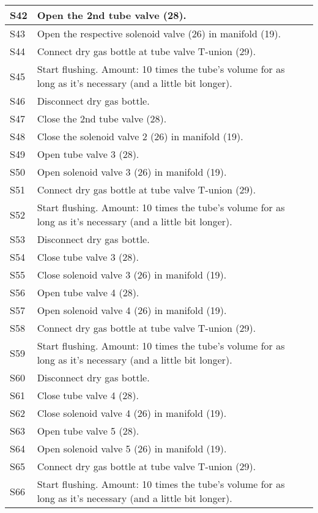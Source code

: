 \begin{longtable} {|m{}|m{}|m{}|}
\hline
S42 & Open the 2nd tube valve (28). & \\
\hline
S43 & Open the respective solenoid valve (26) in manifold (19). & \\
\hline
S44 & Connect dry gas bottle at tube valve T-union (29). & \\
\hline
S45 & Start flushing. Amount: 10 times the tube's volume for as long as it's necessary (and a little bit longer). & \\
\hline
S46 & Disconnect dry gas bottle. & \\
\hline
S47 & Close the 2nd tube valve (28). & \\
\hline
S48 & Close the solenoid valve 2 (26) in manifold (19). & \\
\hline
S49 & Open tube valve 3 (28). & \\
\hline
S50 & Open solenoid valve 3 (26) in manifold (19). & \\
\hline
S51 & Connect dry gas bottle at tube valve T-union (29). & \\
\hline
S52 & Start flushing. Amount: 10 times the tube's volume for as long as it's necessary (and a little bit longer). & \\
\hline
S53 & Disconnect dry gas bottle. & \\
\hline
S54 & Close tube valve 3 (28). & \\
\hline
S55 & Close solenoid valve 3 (26) in manifold (19). & \\
\hline
S56 & Open tube valve 4 (28). & \\
\hline
S57 & Open solenoid valve 4 (26) in manifold (19). & \\
\hline
S58 & Connect dry gas bottle at tube valve T-union (29). & \\
\hline
S59 & Start flushing. Amount: 10 times the tube's volume for as long as it's necessary (and a little bit longer). & \\
\hline
S60 & Disconnect dry gas bottle. & \\
\hline
S61 & Close tube valve 4 (28). & \\
\hline
S62 & Close solenoid valve 4 (26) in manifold (19). & \\
\hline
S63 & Open tube valve 5 (28). & \\
\hline
S64 & Open solenoid valve 5 (26) in manifold (19). & \\
\hline
S65 & Connect dry gas bottle at tube valve T-union (29). & \\
\hline
S66 & Start flushing. Amount: 10 times the tube's volume for as long as it's necessary (and a little bit longer). & \\

\end{longtable}
